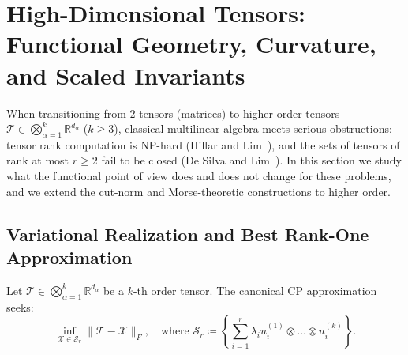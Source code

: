 \documentclass[11pt,a4paper,reqno]{amsart}
\theoremstyle{definition}
\numberwithin{equation}{section}
\newcommand{\R}{\mathbb{R}}
\begin{document}
\section{High-Dimensional Tensors: Functional Geometry, Curvature, and Scaled Invariants}
\label{sec:tensors}

When transitioning from 2-tensors (matrices) to higher-order tensors $\mathcal{T} \in \bigotimes_{\alpha=1}^k \R^{d_\alpha}$ ($k \ge 3$), classical multilinear algebra meets serious obstructions: tensor rank computation is NP-hard (Hillar and Lim~\cite{hillar2013most}), and the sets of tensors of rank at most $r \ge 2$ fail to be closed (De Silva and Lim~\cite{desilva2008illposed}). In this section we study what the functional point of view does and does not change for these problems, and we extend the cut-norm and Morse-theoretic constructions to higher order.

\subsection{Variational Realization and Best Rank-One Approximation}
\label{subsec:tensors_border_rank}

Let $\mathcal{T} \in \bigotimes_{\alpha=1}^k \R^{d_\alpha}$ be a $k$-th order tensor. The canonical CP approximation seeks:
\begin{equation}
    \label{eq:cp_approx_problem}
    \inf_{\mathcal{X} \in \mathcal{S}_r} \|\mathcal{T} - \mathcal{X}\|_F, \quad \text{where } \mathcal{S}_r \coloneqq \left\{ \sum_{i=1}^r \lambda_i u_i^{(1)} \otimes \dots \otimes u_i^{(k)} \right\}.
\end{equation}
\end{document}
